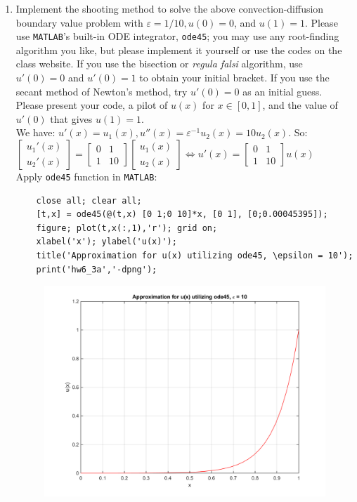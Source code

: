 \documentclass[14pt,a4paper]{article}
\begin{document}
\begin{enumerate}
	\label{3a}
	\item Implement the shooting method to solve the above convection-diffusion boundary value problem with $\varepsilon = 1/10, u(0) = 0$, and $u(1) = 1$. Please use \texttt{MATLAB}'s built-in ODE integrator, \texttt{ode45}; you may use any root-finding algorithm you like, but please implement it yourself or use the codes on the class website. If you use the bisection or \textit{regula falsi} algorithm, use $u'(0) = 0$ and $u'(0) = 1$ to obtain your initial bracket. If you use the secant method of Newton's method, try $u'(0) = 0$ as an initial guess.\\
	Please present your code, a pilot of $u(x)$ for $ x \in [0,1]$, and the value of $u'(0)$ that gives $u(1) = 1$.\\
	We have: $u'(x) = u_1(x), u''(x) = \varepsilon^{-1}u_2(x) = 10u_2(x)$. So:\\
	\hspace*{2cm} $\begin{bmatrix} u_1'(x) \\ u_2'(x) \end{bmatrix} = \begin{bmatrix} 0&1\\1&10 \end{bmatrix} \begin{bmatrix} u_1(x)\\u_2(x) \end{bmatrix} \Leftrightarrow u'(x) = \begin{bmatrix} 0&1\\1&10 \end{bmatrix} u(x)$\\
	Apply \texttt{ode45} function in \texttt{MATLAB}:
	\begin{lstlisting}
	close all; clear all;
	[t,x] = ode45(@(t,x) [0 1;0 10]*x, [0 1], [0;0.00045395]);
	figure; plot(t,x(:,1),'r'); grid on;
	xlabel('x'); ylabel('u(x)');
	title('Approximation for u(x) utilizing ode45, \epsilon = 10');
	print('hw6_3a','-dpng');
	\end{lstlisting}
	\begin{figure}[htp]
		\centering
		\includegraphics[scale=0.5]{hw6_3a.png}

\end{figure}
\end{enumerate}
\end{document}
